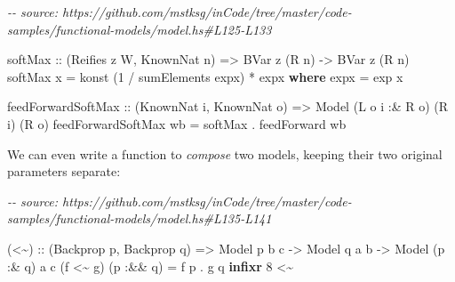 \documentclass[]{article}
\newenvironment{Shaded}{}{}
\newcommand{\CommentTok}[1]{\textcolor[rgb]{0.38,0.63,0.69}{\textit{#1}}}
\newcommand{\DataTypeTok}[1]{\textcolor[rgb]{0.56,0.13,0.00}{#1}}
\newcommand{\DecValTok}[1]{\textcolor[rgb]{0.25,0.63,0.44}{#1}}
\newcommand{\FunctionTok}[1]{\textcolor[rgb]{0.02,0.16,0.49}{#1}}
\newcommand{\KeywordTok}[1]{\textcolor[rgb]{0.00,0.44,0.13}{\textbf{#1}}}
\newcommand{\NormalTok}[1]{#1}
\newcommand{\OperatorTok}[1]{\textcolor[rgb]{0.40,0.40,0.40}{#1}}
\newcommand{\OtherTok}[1]{\textcolor[rgb]{0.00,0.44,0.13}{#1}}
\begin{document}
\begin{Shaded}
\begin{Highlighting}[]
\CommentTok{{-}{-} source: https://github.com/mstksg/inCode/tree/master/code{-}samples/functional{-}models/model.hs\#L125{-}L133}

\OtherTok{softMax ::}\NormalTok{ (}\DataTypeTok{Reifies}\NormalTok{ z }\DataTypeTok{W}\NormalTok{, }\DataTypeTok{KnownNat}\NormalTok{ n) }\OtherTok{=>} \DataTypeTok{BVar}\NormalTok{ z (}\DataTypeTok{R}\NormalTok{ n) }\OtherTok{{-}>} \DataTypeTok{BVar}\NormalTok{ z (}\DataTypeTok{R}\NormalTok{ n)}
\NormalTok{softMax x }\OtherTok{=}\NormalTok{ konst (}\DecValTok{1} \OperatorTok{/}\NormalTok{ sumElements expx) }\OperatorTok{*}\NormalTok{ expx}
  \KeywordTok{where}
\NormalTok{    expx }\OtherTok{=} \FunctionTok{exp}\NormalTok{ x}

\NormalTok{feedForwardSoftMax}
\OtherTok{    ::}\NormalTok{ (}\DataTypeTok{KnownNat}\NormalTok{ i, }\DataTypeTok{KnownNat}\NormalTok{ o)}
    \OtherTok{=>} \DataTypeTok{Model}\NormalTok{ (}\DataTypeTok{L}\NormalTok{ o i }\OperatorTok{:\&} \DataTypeTok{R}\NormalTok{ o) (}\DataTypeTok{R}\NormalTok{ i) (}\DataTypeTok{R}\NormalTok{ o)}
\NormalTok{feedForwardSoftMax wb }\OtherTok{=}\NormalTok{ softMax }\OperatorTok{.}\NormalTok{ feedForward wb}
\end{Highlighting}
\end{Shaded}

We can even write a function to \emph{compose} two models, keeping their two
original parameters separate:

\begin{Shaded}
\begin{Highlighting}[]
\CommentTok{{-}{-} source: https://github.com/mstksg/inCode/tree/master/code{-}samples/functional{-}models/model.hs\#L135{-}L141}

\NormalTok{(}\OperatorTok{<\textasciitilde{}}\NormalTok{)}
\OtherTok{    ::}\NormalTok{ (}\DataTypeTok{Backprop}\NormalTok{ p, }\DataTypeTok{Backprop}\NormalTok{ q)}
    \OtherTok{=>} \DataTypeTok{Model}\NormalTok{  p       b c}
    \OtherTok{{-}>} \DataTypeTok{Model}\NormalTok{       q  a b}
    \OtherTok{{-}>} \DataTypeTok{Model}\NormalTok{ (p }\OperatorTok{:\&}\NormalTok{ q) a c}
\NormalTok{(f }\OperatorTok{<\textasciitilde{}}\NormalTok{ g) (p }\OperatorTok{:\&\&}\NormalTok{ q) }\OtherTok{=}\NormalTok{ f p }\OperatorTok{.}\NormalTok{ g q}
\KeywordTok{infixr} \DecValTok{8} \OperatorTok{<\textasciitilde{}}
\end{Highlighting}
\end{Shaded}
\end{document}
